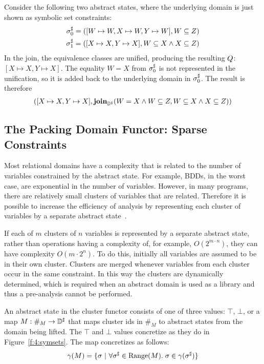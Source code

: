 \begin{example}
Consider the following two abstract states, where the underlying domain is just shown as symbolic set constraints:
\begin{align*}
  {\sigma}^{\sharp}_0 = ([W \mapsto W, X \mapsto W, Y \mapsto W], W \subseteq Z) \\
  {\sigma}^{\sharp}_1 = ([X \mapsto X, Y \mapsto X], W \subseteq X \wedge X \subseteq Z)
\end{align*}
In the join, the equivalence classes are unified, producing the resulting $Q$: $[X \mapsto X, Y \mapsto X]$.  The equality $W = X$ from ${\sigma}^{\sharp}_0$ is not represented in the unification, so it is added back to the underlying domain in ${\sigma}^{\sharp}_0$.  The result is therefore
\begin{align*}
  ([X \mapsto X, Y \mapsto X], \textbf{join}_{{\mathbb{D}}^{\sharp}}(W = X \wedge W \subseteq Z, W \subseteq X \wedge X \subseteq Z))
\end{align*}
\end{example}

\subsection{The Packing Domain Functor: Sparse Constraints}
\label{s:4:5:packs}
Most relational domains have a complexity that is related to the number of variables constrained by the abstract state.  For example, BDDs, in the worst case, are exponential in the number of variables.  However, in many programs, there are relatively small clusters of variables that are related.  Therefore it is possible to increase the efficiency of analysis by representing each cluster of variables by a separate abstract state~\cite{ens:pldi:03}.

If each of $m$ clusters of $n$ variables is represented by a separate abstract state, rather than operations having a complexity of, for example, $O(2^{m\cdot n})$, they can have complexity $O(m\cdot 2^n)$.  To do this, initially all variables are assumed to be in their own cluster.  Clusters are merged whenever variables from each cluster occur in the same constraint.  In this way the clusters are dynamically determined, which is required when an abstract domain is used as a library and thus a pre-analysis cannot be performed.

An abstract state in the cluster functor consists of one of three values: $\top$, $\bot$, or a map $M : \#_M \rightarrow {\mathbb{D}}^{\sharp}$ that maps cluster ids in $\#_M$ to abstract states from the domain being lifted.  The $\top$ and $\bot$ values concretize as they do in Figure~\ref{f:4:symsets}.  The map concretizes as follows:
\begin{align*}
  \gamma(M) = \{ \sigma \ | \ \forall {\sigma}^{\sharp} \in \textrm{Range}(M). \; \sigma \in \gamma({\sigma}^{\sharp}) \}
\end{align*}

